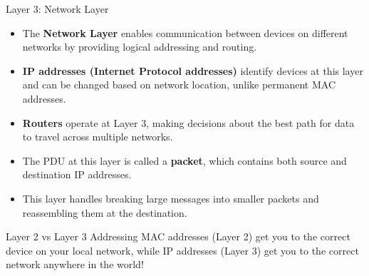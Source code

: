 \documentclass[aspectratio=169]{beamer}
\begin{document}
\begin{frame}{Layer 3: Network Layer}

\begin{itemize}
    \item The \textbf{Network Layer} enables communication between devices on different networks by providing logical addressing and routing.
    \item \textbf{IP addresses (Internet Protocol addresses)} identify devices at this layer and can be changed based on network location, unlike permanent MAC addresses.
    \item \textbf{Routers} operate at Layer 3, making decisions about the best path for data to travel across multiple networks.
    \item The PDU at this layer is called a \textbf{packet}, which contains both source and destination IP addresses.
    \item This layer handles breaking large messages into smaller packets and reassembling them at the destination.
\end{itemize}

\vspace{0.3cm}

\begin{alertblock}{Layer 2 vs Layer 3 Addressing}
MAC addresses (Layer 2) get you to the correct device on your local network, while IP addresses (Layer 3) get you to the correct network anywhere in the world!
\end{alertblock}

\end{frame}
\end{document}
